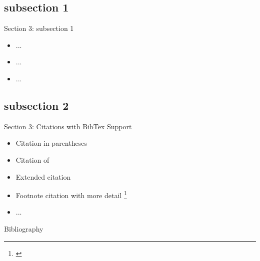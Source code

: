 \documentclass{beamer}
\begin{document}
\subsection{subsection 1}
\begin{frame}{Section 3: subsection 1}
\begin{itemize}
	\item ...
	\item ...
	\item ...
\end{itemize}
\end{frame}
\subsection{subsection 2}
\begin{frame}{Section 3: Citations with BibTex Support}
\begin{itemize}
	\item Citation in parentheses \citep{Knuth92, ConcreteMath, Simpson}
	\item Citation of \cite{Knuth92, ConcreteMath, Simpson}
	\item Extended citation \citep[][J Chem Inf Model, 46, 1912-1918]{ConcreteMath}
	\item Footnote citation with more detail \citep{Knuth92}\footnote{\citep[][J Chem Inf Model]{Simpson}}
	\item ...
\end{itemize}
\end{frame}
\def\newblock{\hskip .11em plus .33em minus .07em} %
\begin{frame}[allowframebreaks]{Bibliography}
\scriptsize 
\nocite{Knuth92, ConcreteMath, Simpson} %
\end{frame}
\end{document}
